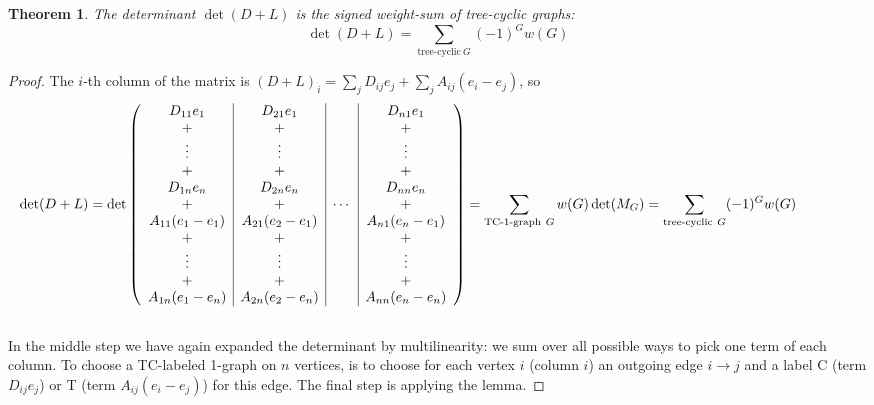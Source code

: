 \documentclass[a4paper, 11pt]{article}
\newtheorem{theorem}{Theorem}[section]
\theoremstyle{definition}
\begin{document}
\begin{theorem} The determinant $\det(D+L)$ is the signed weight-sum of tree-cyclic graphs:
  \[
    \det(D + L) = \sum_{\text{tree-cyclic}\ G} (-1)^G w(G)
  \]
\end{theorem}
\begin{proof}
  The $i$-th column of the matrix is $(D + L)_i = \sum_j D_{ij} e_j + \sum_j A_{ij}(e_i - e_j)$, so \\
  \begin{align*}
    \hspace*{-1.5cm}
    \det(D + L) = \det \left(
    \begin{array}{c|c|c|c}
      D_{11} e_1         & D_{21} e_1         &        & D_{n1} e_1          \\
      +                  & +                  &        & +                   \\
      \vdots             & \vdots             &        & \vdots              \\
      +                  & +                  &        & +                   \\
      D_{1n} e_n         & D_{2n} e_n         &        & D_{nn} e_n          \\
      +                  & +                  & \cdots & +                   \\
      A_{11} (e_1 - e_1) & A_{21} (e_2 - e_1) &        & A_{n1} (e_n - e_1)  \\
      +                  & +                  &        & +                   \\
      \vdots             & \vdots             &        & \vdots              \\
      +                  & +                  &        & +                   \\
      A_{1n} (e_1 - e_n) & A_{2n} (e_2 - e_n) &        & A_{nn} (e_n - e_n)
    \end{array} \right)
    = \sum_{\text{TC-1-graph}\ G} w(G) \det(M_G)
    = \sum_{\text{tree-cyclic}\ G} (-1)^G w(G)
  \end{align*} \\
  In the middle step we have again expanded the determinant by multilinearity: we sum over all possible ways to pick one term of each column. To choose a TC-labeled 1-graph on $n$ vertices, is to choose for each vertex $i$ (column $i$) an outgoing edge $i \to j$ and a label C (term $D_{ij} e_j$) or T (term $A_{ij}(e_i - e_j)$) for this edge. The final step is applying the lemma.
\end{proof}
\end{document}

